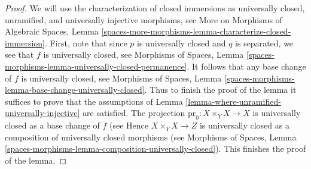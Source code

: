 \begin{proof}
We will use the characterization of closed immersions as
universally closed, unramified, and universally injective morphisms, see
More on Morphisms of Algebraic Spaces, Lemma
\ref{spaces-more-morphisms-lemma-characterize-closed-immersion}.
First, note that since $p$ is universally closed and $q$ is
separated, we see that $f$ is universally closed, see
Morphisms of Spaces, Lemma
\ref{spaces-morphisms-lemma-universally-closed-permanence}.
It follows that any base change of $f$ is universally closed, see
Morphisms of Spaces, Lemma
\ref{spaces-morphisms-lemma-base-change-universally-closed}.
Thus to finish the proof of the lemma it suffices to prove that
the assumptions of
Lemma \ref{lemma-where-unramified-universally-injective}
are satisfied. The projection $\text{pr}_0 : X \times_Y X \to X$
is universally closed as a base change of $f$ (see
Hence $X \times_Y X \to Z$ is universally closed as
a composition of universally closed morphisms (see
Morphisms of Spaces, Lemma
\ref{spaces-morphisms-lemma-composition-universally-closed}).
This finishes the proof of the lemma.
\end{proof}














